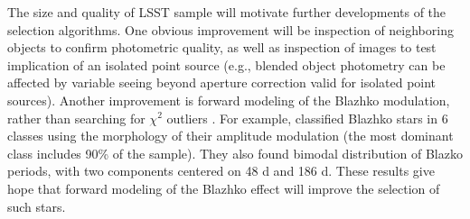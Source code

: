 The size and quality of LSST sample will motivate further developments of the selection algorithms. 
One obvious improvement will be inspection of neighboring objects to confirm photometric quality,
as well as inspection of images to test implication of an isolated point source (e.g., blended object photometry
can be affected by variable seeing beyond aperture correction valid for isolated point sources). 
Another improvement is forward modeling of the Blazhko modulation, rather than searching for $\chi^2$
outliers \citep{2011MNRAS.417..974B, 2012MNRAS.424..649G}.
For example, \cite{2020MNRAS.494.1237S} classified Blazhko stars in 6 classes using the morphology
of their amplitude modulation (the most dominant class includes 90\% of the sample). They also found bimodal distribution
of Blazko periods, with two components centered on 48 d and 186 d. These results give hope that forward
modeling of the Blazhko effect will improve the selection of such stars.
 
 